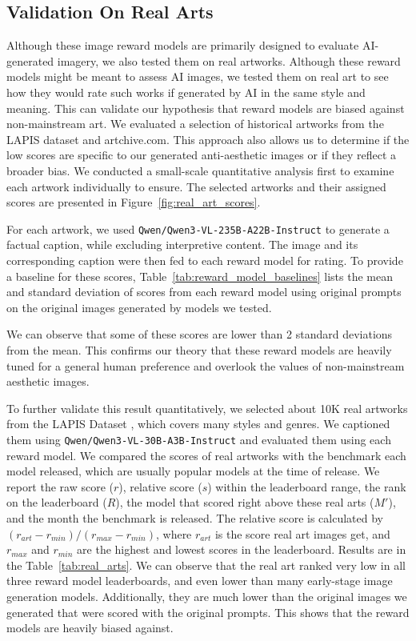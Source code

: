 \subsection{Validation On Real Arts}
Although these image reward models are primarily designed to evaluate AI-generated imagery, we also tested them on real artworks. Although these reward models might be meant to assess AI images, we tested them on real art to see how they would rate such works if generated by AI in the same style and meaning. This can validate our hypothesis that reward models are biased against non-mainstream art. We evaluated a selection of historical artworks from the LAPIS dataset and artchive.com. This approach also allows us to determine if the low scores are specific to our generated anti-aesthetic images or if they reflect a broader bias. We conducted a small-scale quantitative analysis first to examine each artwork individually to ensure. The selected artworks and their assigned scores are presented in Figure~\ref{fig:real_art_scores}.

For each artwork, we used \texttt{Qwen/Qwen3-VL-235B-A22B-Instruct} to generate a factual caption, while excluding interpretive content. The image and its corresponding caption were then fed to each reward model for rating. To provide a baseline for these scores, Table~\ref{tab:reward_model_baselines} lists the mean and standard deviation of scores from each reward model using original prompts on the original images generated by models we tested.

 We can observe that some of these scores are lower than 2 standard deviations from the mean. This confirms our theory that these reward models are heavily tuned for a general human preference and overlook the values of non-mainstream aesthetic images. 

To further validate this result quantitatively, we selected about 10K real artworks from the LAPIS Dataset \cite{maerten_lapis_2025}, which covers many styles and genres. We captioned them using \texttt{Qwen/Qwen3-VL-30B-A3B-Instruct} and evaluated them using each reward model. We compared the scores of real artworks with the benchmark each model released, which are usually popular models at the time of release. We report the raw score ($r$), relative score ($s$) within the leaderboard range, the rank on the leaderboard ($R$), the model that scored right above these real arts ($M'$), and the month the benchmark is released. The relative score is calculated by $(r_{art}-r_{min})/(r_{max} - r_{min})$, where $r_{art}$ is the score real art images get, and $r_{max}$ and $r_{min}$ are the highest and lowest scores in the leaderboard. Results are in the Table~\ref{tab:real_arts}. We can observe that the real art ranked very low in all three reward model leaderboards, and even lower than many early-stage image generation models. Additionally, they are much lower than the original images we generated that were scored with the original prompts. This shows that the reward models are heavily biased against. 

